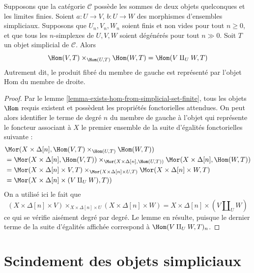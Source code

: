 \begin{lemma}
\label{lemma-hom-from-coprod}
Supposons que la catégorie $\mathcal{C}$ possède les sommes de deux
objets quelconques et les limites finies. Soient
$a : U \to V$, $b : U \to W$ des morphismes d'ensembles simpliciaux.
Supposons que $U_n, V_n, W_n$ soient finis et non vides pour tout
$n \geq 0$, et que tous les $n$-simplexes de $U, V, W$ soient dégénérés
pour tout $n \gg 0$.
Soit $T$ un objet simplicial de $\mathcal{C}$. Alors
$$
\Hom(V, T) \times_{\Hom(U, T)} \Hom(W, T)
=
\Hom(V \amalg_U W, T)
$$
Autrement dit, le produit fibré du membre de gauche est représenté par
l'objet Hom du membre de droite.
\end{lemma}

\begin{proof}
Par le lemme \ref{lemma-exists-hom-from-simplicial-set-finite}, tous les
objets $\Hom$ requis existent et possèdent les propriétés fonctorielles
attendues. On peut alors identifier le terme de degré $n$ du membre de
gauche à l'objet qui représente le foncteur associant à $X$ le premier
ensemble de la suite d'égalités fonctorielles suivante :
\begin{align*}
&
\Mor(X \times \Delta[n],
\Hom(V, T) \times_{\Hom(U, T)} \Hom(W, T)) \\
& =
\Mor(X \times \Delta[n], \Hom(V, T))
\times_{\Mor(X \times \Delta[n], \Hom(U, T))}
\Mor(X \times \Delta[n], \Hom(W, T)) \\
& =
\Mor(X \times \Delta[n] \times V, T)
\times_{\Mor(X \times \Delta[n] \times U, T)}
\Mor(X \times \Delta[n] \times W, T) \\
& =
\Mor(X \times \Delta[n] \times (V \amalg_U W), T))
\end{align*}
On a utilisé ici le fait que
$$
(X \times \Delta[n] \times V)
\times_{X \times \Delta[n] \times U}
(X \times \Delta[n] \times W)
=
X \times \Delta[n] \times (V \amalg_U W)
$$
ce qui se vérifie aisément degré par degré. Le lemme en résulte, puisque
le dernier terme de la suite d'égalités affichée correspond à
$\Hom(V \amalg_U W, T)_n$.
\end{proof}













\section{Scindement des objets simpliciaux}
\label{section-splitting}

